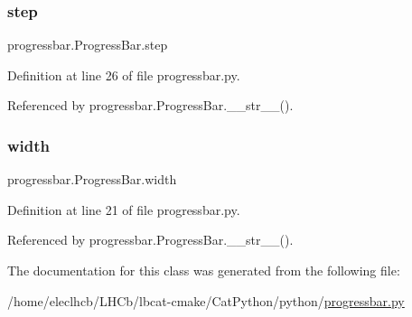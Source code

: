 \subsubsection{\texorpdfstring{step}{step}}
{\footnotesize\ttfamily progressbar.\+Progress\+Bar.\+step}



Definition at line 26 of file progressbar.\+py.



Referenced by progressbar.\+Progress\+Bar.\+\_\+\+\_\+str\+\_\+\+\_\+().

\mbox{\label{classprogressbar_1_1ProgressBar_abde0c8da19e6e6bcde845b1eb3cee279}} 
\subsubsection{\texorpdfstring{width}{width}}
{\footnotesize\ttfamily progressbar.\+Progress\+Bar.\+width}



Definition at line 21 of file progressbar.\+py.



Referenced by progressbar.\+Progress\+Bar.\+\_\+\+\_\+str\+\_\+\+\_\+().



The documentation for this class was generated from the following file\+:\begin{DoxyCompactItemize}
\item 
/home/eleclhcb/\+L\+H\+Cb/lbcat-\/cmake/\+Cat\+Python/python/\hyperlink{progressbar_8py}{progressbar.\+py}\end{DoxyCompactItemize}
